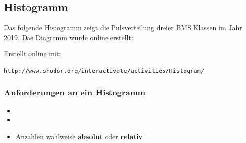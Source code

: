 



\subsection{Histogramm}

Das folgende Histogramm zeigt die Pulsverteilung dreier BMS Klassen im Jahr 2019. Das Diagramm wurde online erstellt:


Erstellt online mit:

\texttt{http://www.shodor.org/interactivate/activities/Histogram/}

\newpage


\subsubsection{Anforderungen an ein Histogramm}
\begin{itemize}
\item {}
  \vspace{8mm}
\item {}
  \vspace{8mm}
  \item Anzahlen wahlweise \textbf{absolut} oder \textbf{relativ}
\end{itemize}

